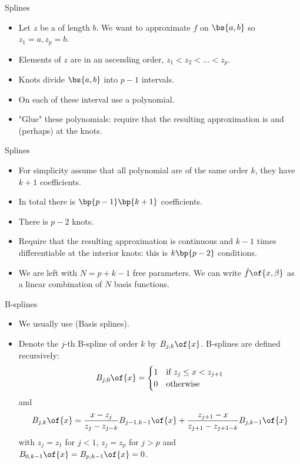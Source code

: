 \documentclass[11pt,xcolor={dvipsnames},aspectratio=159,hyperref={pdftex,pdfpagemode=UseNone,hidelinks,pdfdisplaydoctitle=true},usepdftitle=false]{beamer}
\begin{document}
\begin{frame}{Splines}
    \begin{itemize}
        \item Let $z$ be a  of length $b$. We want to approximate $f$ on $\bs{a,b}$ so $z_1=a,z_p=b$. 
        \item Elements of $z$ are in an ascending order, $z_1<z_2<\ldots<z_p$.
        \item Knots divide $\bs{a,b}$ into $p-1$ intervals.
        \item On each of these interval use a  polynomial.
        \item "Glue" these polynomials: require that the resulting approximation is  and (perhaps)  at the knots.
    \end{itemize}
\end{frame}

\begin{frame}{Splines}
    \begin{itemize}
        \item For simplicity assume that all polynomial are of the same order $k$, they have $k+1$ coefficients.
        \item In total there is $\bp{p-1}\bp{k+1}$ coefficients. 
        \item There is $p-2$  knots.
        \item Require that the resulting approximation is continuous and $k-1$ times differentiable at the interior knots: this is $k\bp{p-2}$ conditions.
        \item We are left with $N=p+k-1$ free parameters. We can write $\hat{f}\of{x,\beta}$ as a linear combination of $N$ basis functions.
    \end{itemize}
\end{frame}

\begin{frame}{B-splines}
    \begin{itemize}
    \item We usually use  (Basis splines). 
    \item Denote the $j$-th B-spline of order $k$ by $B_{j,k}\of{x}$. B-splines are defined recursively:
    \begin{align*}
        B_{j,0}\of{x}= \begin{cases}
            1 & \text{if } z_j \leq x < z_{j+1} \\
            0 & \text{otherwise}
            \end{cases}
    \end{align*}
    and
    \begin{align*}
        B_{j,k}\of{x}= 
            \frac{x-z_j}{z_{j}-z_{j-k}} B_{j-1,k-1}\of{x} + \frac{z_{j+1}-x}{z_{j+1}-z_{j+1-k}} B_{j,k-1}\of{x}
    \end{align*}
    with $z_j = z_1$ for $j<1$, $z_j = z_p$ for $j>p$ and $B_{0,k-1}\of{x}=B_{p,k-1}\of{x}=0$.
\end{itemize}
    \end{frame}
\end{document}
